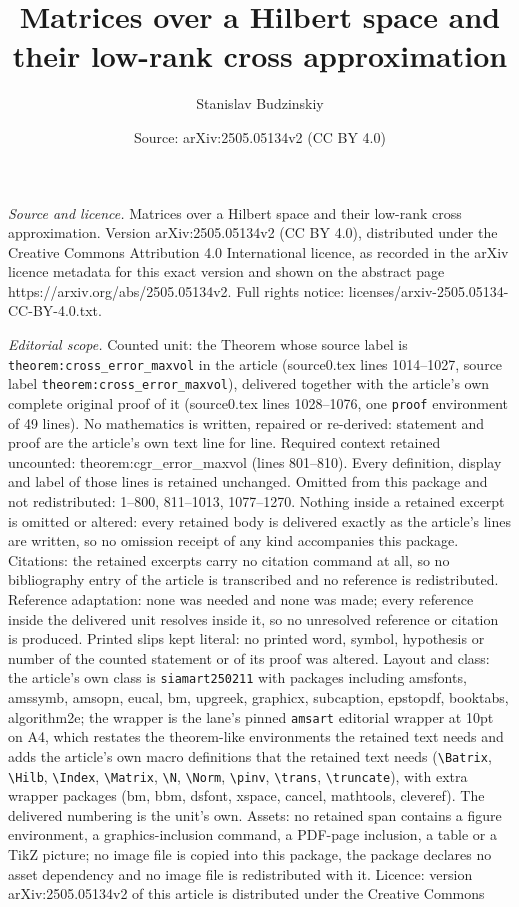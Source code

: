 \documentclass[10pt,a4paper]{amsart}
\title[Matrices over a Hilbert space and their low-rank cross appro]{Matrices over a Hilbert space and their low-rank cross approximation}
\author{Stanislav Budzinskiy}
\date{Source: arXiv:2505.05134v2 (CC BY 4.0)}
\begin{document}
\maketitle

\noindent\emph{Source and licence.} Matrices over a Hilbert space and their low-rank cross approximation. Version arXiv:2505.05134v2 (CC BY 4.0), distributed under the Creative Commons Attribution 4.0 International licence, as recorded in the arXiv licence metadata for this exact version and shown on the abstract page https://arxiv.org/abs/2505.05134v2. Full rights notice: licenses/arxiv-2505.05134-CC-BY-4.0.txt.\par\smallskip

\noindent\textit{Editorial scope.} Counted unit: the Theorem whose source label is \texttt{theorem:cross\_error\_maxvol} in the article (source0.tex lines 1014--1027, source label \texttt{theorem:cross\_error\_maxvol}), delivered together with the article's own complete original proof of it (source0.tex lines 1028--1076, one \texttt{proof} environment of 49 lines). No mathematics is written, repaired or re-derived: statement and proof are the article's own text line for line. Required context retained uncounted: theorem:cgr\_error\_maxvol (lines 801--810). Every definition, display and label of those lines is retained unchanged. Omitted from this package and not redistributed: 1--800, 811--1013, 1077--1270. Nothing inside a retained excerpt is omitted or altered: every retained body is delivered exactly as the article's lines are written, so no omission receipt of any kind accompanies this package. Citations: the retained excerpts carry no citation command at all, so no bibliography entry of the article is transcribed and no reference is redistributed. Reference adaptation: none was needed and none was made; every reference inside the delivered unit resolves inside it, so no unresolved reference or citation is produced. Printed slips kept literal: no printed word, symbol, hypothesis or number of the counted statement or of its proof was altered. Layout and class: the article's own class is \texttt{siamart250211} with packages including amsfonts, amssymb, amsopn, eucal, bm, upgreek, graphicx, subcaption, epstopdf, booktabs, algorithm2e; the wrapper is the lane's pinned \texttt{amsart} editorial wrapper at 10pt on A4, which restates the theorem-like environments the retained text needs and adds the article's own macro definitions that the retained text needs (\texttt{\textbackslash Batrix}, \texttt{\textbackslash Hilb}, \texttt{\textbackslash Index}, \texttt{\textbackslash Matrix}, \texttt{\textbackslash N}, \texttt{\textbackslash Norm}, \texttt{\textbackslash pinv}, \texttt{\textbackslash trans}, \texttt{\textbackslash truncate}), with extra wrapper packages (bm, bbm, dsfont, xspace, cancel, mathtools, cleveref). The delivered numbering is the unit's own. Assets: no retained span contains a figure environment, a graphics-inclusion command, a PDF-page inclusion, a table or a TikZ picture; no image file is copied into this package, the package declares no asset dependency and no image file is redistributed with it. Licence: version arXiv:2505.05134v2 of this article is distributed under the Creative Commons 
\end{document}
